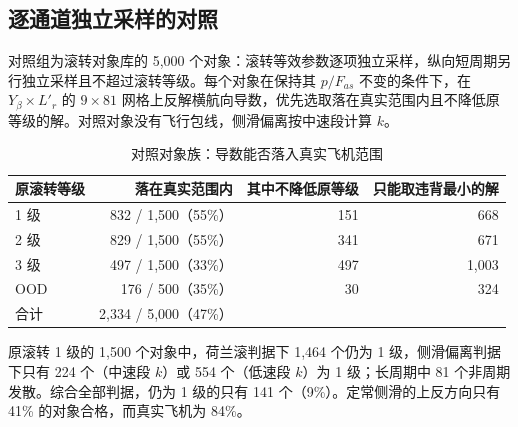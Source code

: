 \documentclass[UTF8,a4paper,11pt,fontset=fandol,scheme=plain]{ctexart}
\begin{document}
\subsection{逐通道独立采样的对照}
\label{app:baseline}
对照组为滚转对象库的 5,000 个对象：滚转等效参数逐项独立采样，纵向短周期另行独立采样且不超过滚转等级。每个对象在保持其 \(p/F_{as}\) 不变的条件下，在 \(Y_\beta\times L'_r\) 的 \(9\times81\) 网格上反解横航向导数，优先选取落在真实范围内且不降低原等级的解。对照对象没有飞行包线，侧滑偏离按中速段计算 \(k\)。

\begin{table}[H]
\centering\small
\caption{对照对象族：导数能否落入真实飞机范围}\label{tab:baseline}
\begin{tabular}{@{}lrrr@{}}
\toprule
原滚转等级 & 落在真实范围内 & 其中不降低原等级 & 只能取违背最小的解 \\
\midrule
1 级 & 832 / 1,500（55\%） & 151 & 668 \\
2 级 & 829 / 1,500（55\%） & 341 & 671 \\
3 级 & 497 / 1,500（33\%） & 497 & 1,003 \\
OOD & 176 / 500（35\%） & 30 & 324 \\
\midrule
合计 & 2,334 / 5,000（47\%） & & \\
\bottomrule
\end{tabular}
\end{table}

原滚转 1 级的 1,500 个对象中，荷兰滚判据下 1,464 个仍为 1 级，侧滑偏离判据下只有 224 个（中速段 \(k\)）或 554 个（低速段 \(k\)）为 1 级；长周期中 81 个非周期发散。综合全部判据，仍为 1 级的只有 141 个（9\%）。定常侧滑的上反方向只有 41\% 的对象合格，而真实飞机为 84\%。
\end{document}
